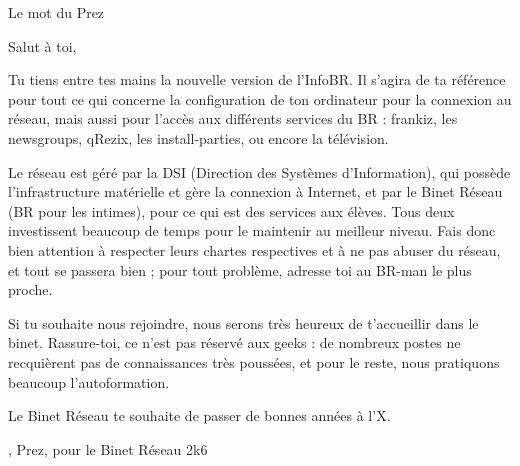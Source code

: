 

\begin{center}
    { \Huge Le mot du Prez }
\end{center}

\indent \indent Salut \`a toi,

Tu tiens entre tes mains la nouvelle version de l'InfoBR. Il s'agira de ta r\'ef\'erence pour tout ce qui concerne la configuration de ton ordinateur pour la connexion au r\'eseau, mais aussi pour l'acc\`es aux diff\'erents services du BR :
frankiz, les newsgroups, qRezix, les install-parties, ou encore la t\'el\'evision.

Le r\'eseau est g\'er\'e par la DSI (Direction des Syst\`emes d'Information), qui poss\`ede l'infrastructure mat\'erielle et g\`ere la connexion \`a Internet,
et par le Binet R\'eseau (BR pour les intimes), pour ce qui est des services aux \'el\`eves. Tous deux investissent beaucoup de temps pour le maintenir au meilleur niveau.
Fais donc bien attention \`a respecter leurs chartes respectives et \`a ne pas abuser du r\'eseau, et tout se passera bien ; pour tout probl\`eme, adresse toi au
BR-man le plus proche.

Si tu souhaite nous rejoindre, nous serons tr\`es heureux de t'accueillir dans le binet. Rassure-toi, ce n'est pas r\'eserv\'e aux geeks : de nombreux postes ne recqui\`erent pas de connaissances tr\`es pouss\'ees, et pour le reste, nous pratiquons beaucoup l'autoformation.

Le Binet R\'eseau te souhaite de passer de bonnes ann\'ees \`a l'X.

\begin{flushright}
    , Prez, pour le Binet R\'eseau 2k6
\end{flushright}
